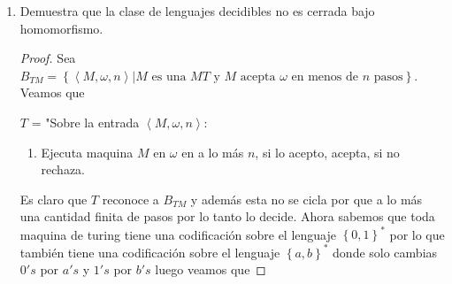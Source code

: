 \documentclass[letterpaper]{article}
\theoremstyle{definition}
\theoremstyle{lemathm}
\theoremstyle{lemathm}
\theoremstyle{lemathm}
\theoremstyle{lemademthm}
\newcommand{\pars}[1]{\left( #1 \right) }
\newcommand{\inprod}[1]{\left\langle #1 \right\rangle }
\newcommand{\set}[1]{\left \{ #1 \right\} }
\newcommand{\1}{\mathbbm{1}}
\begin{document}
\begin{enumerate}
\begin{proof}
				Por lo tanto el siguiente $MT \ L$ decide a $EQ_{AFD}$.

				L = "Sobre la entrada $\inprod{A,B}$ donde $A,B$ son $AFD$:
				\begin{enumerate}
					\item Repite lo siguiente para cada $t = 1,2,3,\cdots,nm$.
					\begin{enumerate}
						\item Repite lo siguiente para cada cadena $\omega \in L\pars{A}\cup L\pars{B}$ tal que el tamaño de $\omega$ es $t$.
						\begin{enumerate}
							\item Ejecuta el $AFD A\times B$ con la entrada $\omega$
						\end{enumerate}
					\end{enumerate}
					\item Si alguna de las anteriores ejecuciones fue rechazada entonces rechaza, si no acepta.
				\end{enumerate}

				Notemos que la cantidad de $\omega \in L\pars{A}\cup L\pars{B}$ con $\omega = t$ es a lo más $\pars{|\Sigma_A| + |\Sigma_B|}^t < \infty$ por lo que la cantidad de pasos es finito y $L$ no se cicla. Concluimos que $EQ_{AFD}$ es decidible.

			\end{proof}

			\item Demuestra que la clase de lenguajes decidibles no es cerrada bajo homomorfismo.
			
			\begin{proof}
				Sea $B_{TM} = \set{\inprod{M,\omega,n} | M \text{ es una $MT$ y $M$ acepta $\omega$ en menos de $n$ pasos}}$. Veamos que

				$T$ = "Sobre la entrada $\inprod{M,\omega,n}$:
				\begin{enumerate}
					\item Ejecuta maquina $M$ en $\omega$ en a lo más $n$, si lo acepto, acepta, si no rechaza.
				\end{enumerate}

				Es claro que $T$ reconoce a $B_{TM}$ y además esta no se cicla por que a lo más una cantidad finita de pasos por lo tanto lo decide. Ahora sabemos que toda maquina de turing tiene una codificación sobre el lenguaje $\set{0,1}^*$ por lo que también tiene una codificación sobre el lenguaje $\set{a,b}^*$ donde solo cambias $0's$ por $a's$ y $1's$ por $b's$ luego veamos que


\end{proof}
\end{enumerate}
\end{document}
